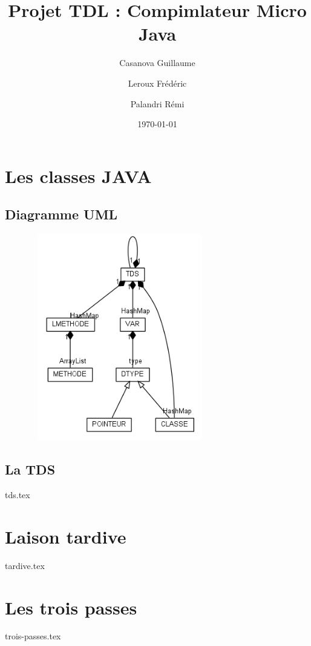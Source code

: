 \documentclass[12pt]{article}
\title{Projet TDL : Compimlateur Micro Java}
\author{ Casanova Guillaume \\
	\and 
	 Leroux Frédéric \\
	\and
	 Palandri Rémi
	}
\date{\today}
\begin{document}
\maketitle

\begin{abstract}

\end{abstract}

\newpage
\setcounter{tocdepth}{1} \tableofcontents

\newpage

\section{Les classes JAVA}
	
	\subsection{Diagramme UML}
		\includegraphics[width=10cm,height=90mm]{img/graph.png}
	\subsection{La TDS}
		
		{tds.tex}
\newpage
\section{Laison tardive}

		{tardive.tex}
\newpage
\section{Les trois passes}
		{trois-passes.tex}	
\newpage
\end{document}
